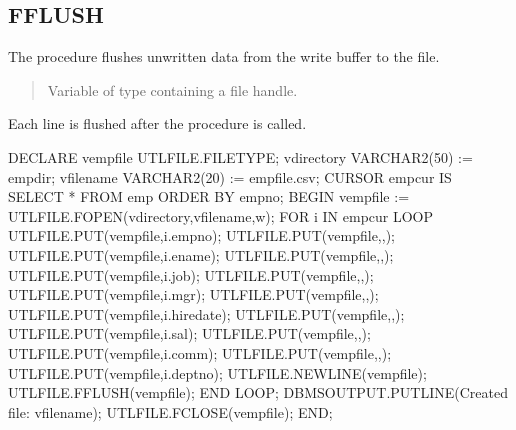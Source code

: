 \documentclass[letterpaper,10pt,english,openany,oneside]{sphinxmanual}
\begin{document}
\subsection{FFLUSH}
\label{\detokenize{utl_file:fflush}}
The  procedure flushes unwritten data from the write buffer to the
file.
\begin{quote}

\end{quote}


\begin{quote}

Variable of type  containing a file handle.
\end{quote}


Each line is flushed after the  procedure is called.

%
\begin{sphinxVerbatim}[commandchars=\\\{\}]
DECLARE
    v\PYGZus{}empfile       UTL\PYGZus{}FILE.FILE\PYGZus{}TYPE;
    v\PYGZus{}directory     VARCHAR2(50) := \PYGZsq{}empdir\PYGZsq{};
    v\PYGZus{}filename      VARCHAR2(20) := \PYGZsq{}empfile.csv\PYGZsq{};
    CURSOR emp\PYGZus{}cur IS SELECT * FROM emp ORDER BY empno;
BEGIN
    v\PYGZus{}empfile := UTL\PYGZus{}FILE.FOPEN(v\PYGZus{}directory,v\PYGZus{}filename,\PYGZsq{}w\PYGZsq{});
    FOR i IN emp\PYGZus{}cur LOOP
        UTL\PYGZus{}FILE.PUT(v\PYGZus{}empfile,i.empno);
        UTL\PYGZus{}FILE.PUT(v\PYGZus{}empfile,\PYGZsq{},\PYGZsq{});
        UTL\PYGZus{}FILE.PUT(v\PYGZus{}empfile,i.ename);
        UTL\PYGZus{}FILE.PUT(v\PYGZus{}empfile,\PYGZsq{},\PYGZsq{});
        UTL\PYGZus{}FILE.PUT(v\PYGZus{}empfile,i.job);
        UTL\PYGZus{}FILE.PUT(v\PYGZus{}empfile,\PYGZsq{},\PYGZsq{});
        UTL\PYGZus{}FILE.PUT(v\PYGZus{}empfile,i.mgr);
        UTL\PYGZus{}FILE.PUT(v\PYGZus{}empfile,\PYGZsq{},\PYGZsq{});
        UTL\PYGZus{}FILE.PUT(v\PYGZus{}empfile,i.hiredate);
        UTL\PYGZus{}FILE.PUT(v\PYGZus{}empfile,\PYGZsq{},\PYGZsq{});
        UTL\PYGZus{}FILE.PUT(v\PYGZus{}empfile,i.sal);
        UTL\PYGZus{}FILE.PUT(v\PYGZus{}empfile,\PYGZsq{},\PYGZsq{});
        UTL\PYGZus{}FILE.PUT(v\PYGZus{}empfile,i.comm);
        UTL\PYGZus{}FILE.PUT(v\PYGZus{}empfile,\PYGZsq{},\PYGZsq{});
        UTL\PYGZus{}FILE.PUT(v\PYGZus{}empfile,i.deptno);
        UTL\PYGZus{}FILE.NEW\PYGZus{}LINE(v\PYGZus{}empfile);
        UTL\PYGZus{}FILE.FFLUSH(v\PYGZus{}empfile);
    END LOOP;
    DBMS\PYGZus{}OUTPUT.PUT\PYGZus{}LINE(\PYGZsq{}Created file: \PYGZsq{} \textbar{}\textbar{} v\PYGZus{}filename);
    UTL\PYGZus{}FILE.FCLOSE(v\PYGZus{}empfile);
END;
\end{sphinxVerbatim}
\end{document}
